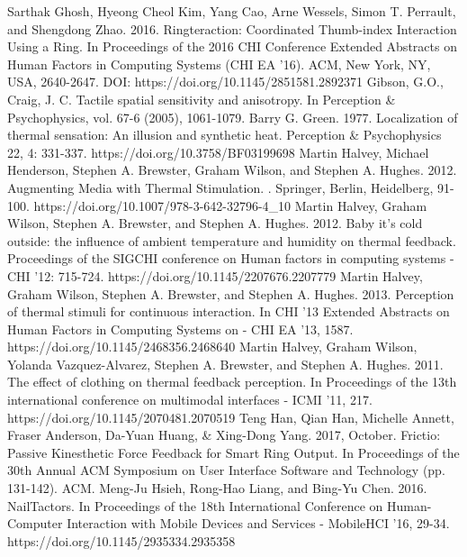 \documentclass[preprint,12pt]{elsarticle}
\begin{document}
\begin{thebibliography}{00}
Sarthak Ghosh, Hyeong Cheol Kim, Yang Cao, Arne Wessels, Simon T. Perrault, and Shengdong Zhao. 2016. Ringteraction: Coordinated Thumb-index Interaction Using a Ring. In Proceedings of the 2016 CHI Conference Extended Abstracts on Human Factors in Computing Systems (CHI EA '16). ACM, New York, NY, USA, 2640-2647. DOI: https://doi.org/10.1145/2851581.2892371
Gibson, G.O., Craig, J. C. Tactile spatial sensitivity and anisotropy. In Perception \& Psychophysics, vol. 67-6 (2005), 1061-1079.
Barry G. Green. 1977. Localization of thermal sensation: An illusion and synthetic heat. Perception \& Psychophysics 22, 4: 331-337. https://doi.org/10.3758/BF03199698
Martin Halvey, Michael Henderson, Stephen A. Brewster, Graham Wilson, and Stephen A. Hughes. 2012. Augmenting Media with Thermal Stimulation. . Springer, Berlin, Heidelberg, 91-100. https://doi.org/10.1007/978-3-642-32796-4\_10
Martin Halvey, Graham Wilson, Stephen A. Brewster, and Stephen A. Hughes. 2012. Baby it's cold outside: the influence of ambient temperature and humidity on thermal feedback. Proceedings of the SIGCHI conference on Human factors in computing systems - CHI '12: 715-724. https://doi.org/10.1145/2207676.2207779
Martin Halvey, Graham Wilson, Stephen A. Brewster, and Stephen A. Hughes. 2013. Perception of thermal stimuli for continuous interaction. In CHI '13 Extended Abstracts on Human Factors in Computing Systems on - CHI EA '13, 1587. https://doi.org/10.1145/2468356.2468640
Martin Halvey, Graham Wilson, Yolanda Vazquez-Alvarez, Stephen A. Brewster, and Stephen A. Hughes. 2011. The effect of clothing on thermal feedback perception. In Proceedings of the 13th international conference on multimodal interfaces - ICMI '11, 217. https://doi.org/10.1145/2070481.2070519
Teng Han, Qian Han, Michelle Annett, Fraser Anderson, Da-Yuan Huang, \& Xing-Dong Yang. 2017, October. Frictio: Passive Kinesthetic Force Feedback for Smart Ring Output. In Proceedings of the 30th Annual ACM Symposium on User Interface Software and Technology (pp. 131-142). ACM.
Meng-Ju Hsieh, Rong-Hao Liang, and Bing-Yu Chen. 2016. NailTactors. In Proceedings of the 18th International Conference on Human-Computer Interaction with Mobile Devices and Services - MobileHCI '16, 29-34. https://doi.org/10.1145/2935334.2935358

\end{thebibliography}
\end{document}

